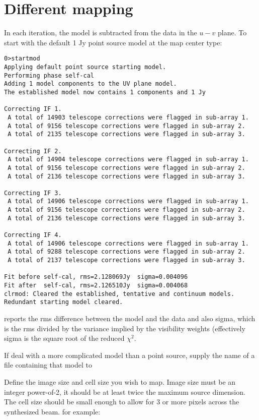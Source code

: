 \documentclass[a4paper,11pt]{article}
\begin{document}
\normalsize
\section{Different mapping}
In each  iteration, the model is subtracted from the data in the $u-v$ plane. To start with the default 1 Jy point source model at the map center type:
\tiny
\begin{lstlisting}
0>startmod
Applying default point source starting model.
Performing phase self-cal
Adding 1 model components to the UV plane model.
The established model now contains 1 components and 1 Jy

Correcting IF 1.
 A total of 14903 telescope corrections were flagged in sub-array 1.
 A total of 9156 telescope corrections were flagged in sub-array 2.
 A total of 2135 telescope corrections were flagged in sub-array 3.

Correcting IF 2.
 A total of 14904 telescope corrections were flagged in sub-array 1.
 A total of 9156 telescope corrections were flagged in sub-array 2.
 A total of 2136 telescope corrections were flagged in sub-array 3.

Correcting IF 3.
 A total of 14906 telescope corrections were flagged in sub-array 1.
 A total of 9156 telescope corrections were flagged in sub-array 2.
 A total of 2136 telescope corrections were flagged in sub-array 3.

Correcting IF 4.
 A total of 14906 telescope corrections were flagged in sub-array 1.
 A total of 9288 telescope corrections were flagged in sub-array 2.
 A total of 2137 telescope corrections were flagged in sub-array 3.

Fit before self-cal, rms=2.128069Jy  sigma=0.004096
Fit after  self-cal, rms=2.126510Jy  sigma=0.004068
clrmod: Cleared the established, tentative and continuum models.
Redundant starting model cleared.
\end{lstlisting}
\normalsize
\par {} reports the rms difference between the model and the data and also sigma, which is the rms divided by the variance implied by the visibility weights (effectively sigma is the square root of the reduced $\chi^2$.
\par If deal with a more complicated model than a point source, supply the name of a file containing that model to 
\par Define the image size and cell size you wish to map. Image size must be an integer power-of-2, it should be at least twice the maximum source dimension. The cell size should be small enough to allow for 3 or more pixels across the synthesized beam. for example:
\end{document}
